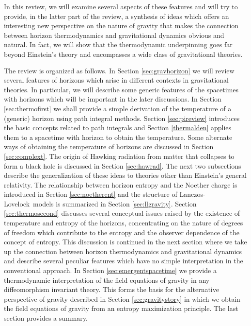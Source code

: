\documentclass[12pt]{iopart}
\newcommand{\LL}{Lanczos-Lovelock}
\begin{document}
 

In this review, we will examine several aspects of these features and will try to provide, in the latter part of the review, a synthesis of ideas which offers an interesting new perspective on the nature of gravity that makes the connection between horizon thermodynamics and gravitational dynamics obvious and natural. In fact, we will show that the thermodynamic underpinning goes far beyond  Einstein's theory and encompasses a wide class of gravitational theories. 

The review is organized as follows. In Section \ref{sec:gravhorizon}
we will review several features of horizons which arise in different contexts in gravitational theories.  In particular, we will describe some generic features of the spacetimes with horizons which will be important in the later discussions. 
In Section \ref{sec:thermofirst} we shall provide a simple derivation
of the temperature of a (generic) horizon using path integral methods.
Section \ref{sec:pireview} introduces the basic concepts related to path integrals and
Section \ref{thermalden} applies them to a spacetime with horizon to obtain the temperature.
Some alternate ways of obtaining the temperature of horizons are discussed in 
Section \ref{sec:complext}. The origin of Hawking radiation from  matter that collapses to form a black hole is discussed in Section \ref{sec:hawrad}. 
The next two subsections describe the generalization of these ideas to theories
other than Einstein's general relativity. The relationship between horizon entropy and
the Noether charge is introduced in Section \ref{sec:noetherent} and
the structure of \LL\ models is summarized in Section \ref{sec:llgravity}.
Section \ref{sec:thermosecond} discusses several conceptual issues raised by the existence of temperature and entropy of the horizons, concentrating on the nature of degrees of freedom which contribute to the entropy and the observer dependence of the concept of entropy. This discussion is continued in the next section where we take up the connection between horizon thermodynamics and gravitational dynamics and describe several peculiar features
 which have no simple interpretation
in the conventional approach. In Section \ref{sec:emergentspacetime} we provide a thermodynamic interpretation of the field equations of gravity in any diffeomorphism invariant theory. This forms the basis for the alternative perspective of gravity described in Section \ref{sec:gravitystory} in which we obtain the field equations of gravity from an entropy maximization principle. The last section provides a summary. 
\end{document}
